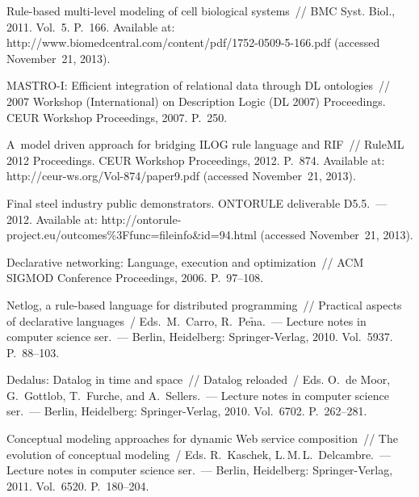 \begin{multicols}{2}
{{\begin{thebibliography}{99}
 Rule-based multi-level modeling of cell
biological systems~// BMC Syst. Biol., 2011. Vol.~5. P.~166. Available at: {\sf
http://www.biomedcentral.com/content/pdf/1752-0509-5-166.pdf} (accessed
November~21, 2013).

MASTRO-I: Efficient integration of relational data through DL ontologies~// 2007
Workshop (International) on Description Logic (DL 2007) Proceedings. CEUR Workshop
Proceedings, 2007. P.~250.

 A~model driven approach for bridging
ILOG rule language and RIF~// RuleML 2012 Proceedings. CEUR Workshop
Proceedings, 2012. P.~874. Available at: {\sf http://ceur-ws.org/Vol-874/paper9.pdf}
(accessed November~21, 2013).

  Final steel industry
public demonstrators. ONTORULE deliverable D5.5.~--- 2012. Available at: {\sf
http://ontorule-project.eu/outcomes\%3Ffunc=fileinfo\&id=94.html} (accessed
November~21, 2013).




 Declarative networking: Language, execution and
optimization~// ACM SIGMOD Conference Proceedings, 2006. P.~97--108.

 Netlog, a rule-based language for distributed programming~//
Practical aspects of declarative
languages~/ Eds.\ M.~Carro, R.~Pe$\tilde{\mbox{n}}$a.~--- Lecture notes
in computer science ser.~--- Berlin, Heidelberg: Springer-Verlag, 2010. Vol.~5937. P.~88--103.

  Dedalus: Datalog in time and space~//
Datalog reloaded~/
Eds. O.~de Moor, G.~Gottlob, T.~Furche, and A.~Sellers.~--- Lecture notes in computer science ser.~---
Berlin, Heidelberg: Springer-Verlag,  2010. Vol.~6702. P.~262--281.

 Conceptual modeling
approaches for dynamic Web service composition~// The evolution of conceptual
modeling~/ Eds. R.~Kaschek, L.\,M.\,L.~Delcambre.~--- Lecture notes in computer science ser.~---
Berlin, Heidelberg: Springer-Verlag, 2011. Vol.~6520. P.~180--204.


\end{thebibliography}}}
\end{multicols}
